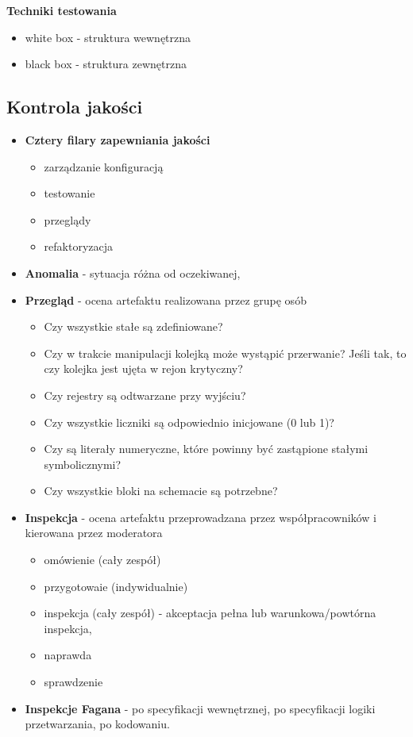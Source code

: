 \documentclass[a4paper]{article}
\begin{document}
    \textbf{Techniki testowania}
    \begin{itemize}
        \item white box - struktura wewnętrzna
        \item black box - struktura zewnętrzna
    \end{itemize}

    \subsection{Kontrola jakości}

    \begin{itemize}
        \item \textbf{Cztery filary zapewniania jakości}
        \begin{itemize}
            \item zarządzanie konfiguracją
            \item testowanie
            \item przeglądy
            \item refaktoryzacja
        \end{itemize}
        \item \textbf{Anomalia} - sytuacja różna od oczekiwanej,
        \item \textbf{Przegląd} - ocena artefaktu realizowana przez grupę osób
        \begin{itemize}
            \item Czy wszystkie stałe są zdefiniowane?
            \item Czy w trakcie manipulacji kolejką może wystąpić przerwanie? Jeśli tak, to czy kolejka jest
            ujęta w rejon krytyczny?
            \item Czy rejestry są odtwarzane przy wyjściu?
            \item Czy wszystkie liczniki są odpowiednio inicjowane (0 lub 1)?
            \item Czy są literały numeryczne, które powinny być zastąpione stałymi symbolicznymi?
            \item Czy wszystkie bloki na schemacie są potrzebne?
        \end{itemize}

        \item \textbf{Inspekcja} - ocena artefaktu przeprowadzana przez współpracowników i kierowana przez moderatora
        \begin{itemize}
            \item omówienie (cały zespół)
            \item przygotowaie (indywidualnie)
            \item inspekcja (cały zespół) - akceptacja pełna lub warunkowa/powtórna inspekcja,
            \item naprawda
            \item sprawdzenie
        \end{itemize}
        \item \textbf{Inspekcje Fagana} - po specyfikacji wewnętrznej, po specyfikacji logiki przetwarzania, po kodowaniu.
    \end{itemize}
\end{document}
